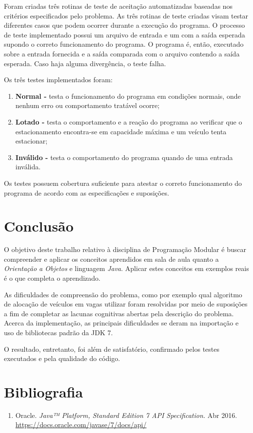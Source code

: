 \documentclass[a4paper,12pt]{article}
\begin{document}
Foram criadas três rotinas de teste de aceitação automatizadas baseadas nos critérios especificados pelo problema. As três rotinas de teste criadas visam testar diferentes casos que podem ocorrer durante a execução do programa. O processo de teste implementado possui um arquivo de entrada e um com a saída esperada supondo o correto funcionamento do programa. O programa é, então, executado sobre a entrada fornecida e a saída comparada com o arquivo contendo a saída esperada. Caso haja alguma divergência, o teste falha.

Os três testes implementados foram:
\begin{enumerate}
    \item \textbf{Normal -} testa o funcionamento do programa em condições normais, onde nenhum erro ou comportamento tratável ocorre;
    \item \textbf{Lotado -} testa o comportamento e a reação do programa ao verificar que o estacionamento encontra-se em capacidade máxima e um veículo tenta estacionar;
    \item \textbf{Inválido -} testa o comportamento do programa quando de uma entrada inválida.
\end{enumerate}

Os testes possuem cobertura suficiente para atestar o correto funcionamento do programa de acordo com as especificações e suposições.

\section{Conclusão}

O objetivo deste trabalho relativo à disciplina de Programação Modular é buscar compreender e aplicar os conceitos aprendidos em sala de aula quanto a \emph{Orientação a Objetos} e linguagem \emph{Java}. Aplicar estes conceitos em exemplos reais é o que completa o aprendizado.

As dificuldades de compreensão do problema, como por exemplo qual algoritmo de alocação de veículos em vagas utilizar foram resolvidas por meio de suposições a fim de completar as lacunas cognitivas abertas pela descrição do problema. Acerca da implementação, as principais dificuldades se deram na importação e uso de bibliotecas padrão da JDK 7.

O resultado, entretanto, foi além de satisfatório, confirmado pelos testes executados e pela qualidade do código.

\section{Bibliografia}

\begin{enumerate}
    \item Oracle. \emph{Java™ Platform, Standard Edition 7 API Specification.} Abr 2016. \url{https://docs.oracle.com/javase/7/docs/api/}
\end{enumerate}
\end{document}
